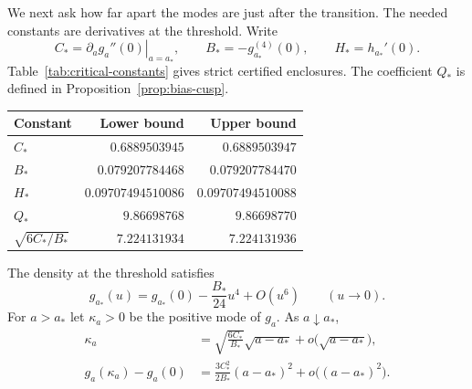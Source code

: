 We next ask how far apart the modes are just after the transition.
The needed constants are derivatives at the threshold. Write
\[
 C_* = \left.\partial_a g_a''(0)\right|_{a=a_*},\qquad
 B_*=-g_{a_*}^{(4)}(0),\qquad H_*=h_{a_*}'(0).
\]
Table~\ref{tab:critical-constants} gives strict certified enclosures.
The coefficient $Q_*$ is defined in Proposition~\ref{prop:bias-cusp}.

\begin{center}\small
\captionsetup{hypcap=false}
\begin{tabular}{@{}lrr@{}}
\toprule
Constant & Lower bound & Upper bound\\
\midrule
$C_*$ & $0.6889503945$ & $0.6889503947$\\
$B_*$ & $0.079207784468$ & $0.079207784470$\\
$H_*$ & $0.09707494510086$ & $0.09707494510088$\\
$Q_*$ & $9.86698768$ & $9.86698770$\\
$\sqrt{6C_*/B_*}$ & $7.224131934$ & $7.224131936$\\
\bottomrule
\end{tabular}
\label{tab:critical-constants}
\end{center}

\begin{proposition}\label{prop:critical-shape}
The density at the threshold satisfies
\[
 g_{a_*}(u)=g_{a_*}(0)-\frac{B_*}{24}u^4+O(u^6)
 \qquad(u\to0).
\]
For $a>a_*$ let $\kappa_a>0$ be the positive mode of $g_a$. As $a\downarrow a_*$,
\begin{align*}
 \kappa_a&=\sqrt{\frac{6C_*}{B_*}}\sqrt{a-a_*}
                 +o\bigl(\sqrt{a-a_*}\bigr),\\
 g_a(\kappa_a)-g_a(0)&=\frac{3C_*^2}{2B_*}(a-a_*)^2
                 +o\bigl((a-a_*)^2\bigr).
\end{align*}
\end{proposition}

